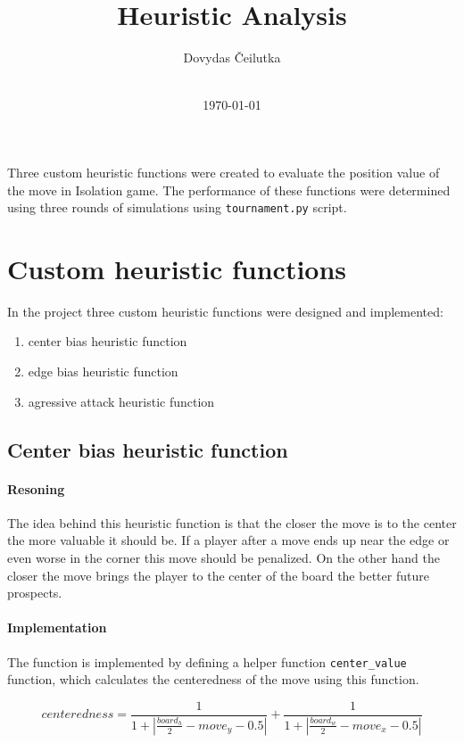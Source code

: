 \documentclass[11pt]{article}
\title{\vspace{-2.0cm}\textbf{Heuristic Analysis}}
\author{Dovydas Čeilutka\\\\}
\date{\today}
\begin{document}
\maketitle

Three custom heuristic functions were created to evaluate the position value of the move in Isolation game. The performance of these functions were determined using three rounds of simulations using \texttt{tournament.py} script.

\section{Custom heuristic functions}

In the project three custom heuristic functions were designed and implemented:

\begin{enumerate}
  \item center bias heuristic function
  \item edge bias heuristic function
  \item agressive attack heuristic function 
\end{enumerate}

\subsection{Center bias heuristic function}

\paragraph{Resoning}

The idea behind this heuristic function is that the closer the move is to the center the more valuable it should be. If a player after a move ends up near the edge or even worse in the corner this move should be penalized. On the other hand the closer the move brings the player to the center of the board the better future prospects.

\paragraph{Implementation}

The function is implemented by defining a helper function \texttt{center{\_}value} function, which calculates the centeredness of the move using this function.

$$centeredness = \frac{1}{1 + |\frac{board_h}{2} - move_y - 0.5|} + \frac{1}{1 + |\frac{board_w}{2} - move_x - 0.5|}$$
\end{document}
